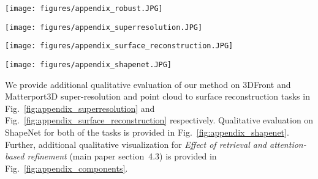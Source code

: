 \begin{figure*}
	\centering
	\texttt{[image: figures/appendix\_robust.JPG]}
	\caption{(Left) Suboptimal retrievals (NN1) when the our method is trained on a ShapeNet subset of 8 classes and evaluated on another 5 classes. The database contains chunks only from the original 8 classes. In this case, the suboptimal retrievals don't help the reconstruction, and the quality of reconstruction does not significantly improve over our backbone network. However, in contrast to naive fusion of retrieval features, our reconstruction quality does not degrade over the backbone. (Right) If the database if augmented with new chunks from train set of the new 5 classes, the reconstruction quality visibly improves without retraining.}
	\label{fig:shapenet_transfer_robust}
\end{figure*}

\begin{figure*}
	\centering
	\texttt{[image: figures/appendix\_superresolution.JPG]}
	\caption{Additional qualitative results on 3DFront (left three) and Matterport3D (right three) on 3D super-resolution task.}
	\label{fig:appendix_superresolution}
\end{figure*}

\begin{figure*}
	\centering
	\texttt{[image: figures/appendix\_surface\_reconstruction.JPG]}
	\caption{Additional qualitative results on 3DFront (left three) and Matterport3D (right three) on point cloud to surface reconstruction task.}
	\label{fig:appendix_surface_reconstruction}
\end{figure*}

\begin{figure*}
	\centering
	\texttt{[image: figures/appendix\_shapenet.JPG]}
	\caption{Qualitative results on ShapeNet dataset on 3D super-resolution (left three) and point cloud to surface reconstruction (right three) tasks.}
	\label{fig:appendix_shapenet}
\end{figure*}


We provide additional qualitative evaluation of our method on 3DFront and Matterport3D super-resolution and point cloud to surface reconstruction tasks in Fig.~\ref{fig:appendix_superresolution} and Fig.~\ref{fig:appendix_surface_reconstruction} respectively. Qualitative evaluation on ShapeNet for both of the tasks is provided in Fig.~\ref{fig:appendix_shapenet}. Further, additional qualitative visualization for \textit{Effect of retrieval and attention-based refinement} (main paper section~4.3) is provided in Fig.~\ref{fig:appendix_components}. 

